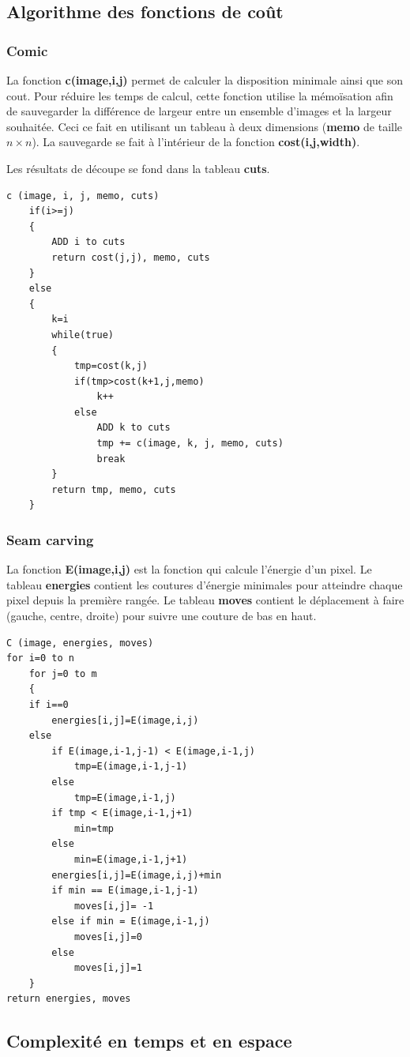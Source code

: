 \documentclass[10pt]{article}
\begin{document}
\subsection{Algorithme des fonctions de coût}
\subsubsection{Comic}La fonction \textbf{ c(image,i,j)} permet de calculer la disposition minimale ainsi que son cout. Pour réduire les temps de calcul, cette fonction utilise la mémoïsation afin de sauvegarder la différence de largeur entre un ensemble d'images et la largeur souhaitée. Ceci ce fait en utilisant un tableau à deux dimensions (\textbf{memo} de taille $n \times n$). La sauvegarde se fait à l'intérieur de la fonction \textbf{cost(i,j,width)}.

Les résultats de découpe se fond dans la tableau \textbf{cuts}.
\begin{lstlisting}[frame=single]
c (image, i, j, memo, cuts)
	if(i>=j)
	{
		ADD i to cuts
		return cost(j,j), memo, cuts 
	}
	else
	{
		k=i
		while(true)
		{
			tmp=cost(k,j)
			if(tmp>cost(k+1,j,memo)
				k++
			else
				ADD k to cuts
				tmp += c(image, k, j, memo, cuts)
				break
		}
		return tmp, memo, cuts
	}
\end{lstlisting}
\subsubsection{Seam carving}
La fonction\textbf{ E(image,i,j)} est la fonction qui calcule l'énergie d'un pixel. Le tableau \textbf{energies} contient les coutures d'énergie minimales pour atteindre chaque pixel depuis la première rangée. Le tableau \textbf{moves} contient le déplacement à faire (gauche, centre, droite) pour suivre une couture de bas en haut. 
\begin{lstlisting}[frame=single]
C (image, energies, moves)
for i=0 to n
	for j=0 to m
	{
	if i==0
		energies[i,j]=E(image,i,j)
	else
		if E(image,i-1,j-1) < E(image,i-1,j)
			tmp=E(image,i-1,j-1)
		else
			tmp=E(image,i-1,j)
		if tmp < E(image,i-1,j+1)
			min=tmp
		else
			min=E(image,i-1,j+1)
		energies[i,j]=E(image,i,j)+min
		if min == E(image,i-1,j-1)			
			moves[i,j]= -1
		else if min = E(image,i-1,j)
			moves[i,j]=0
		else
			moves[i,j]=1
	}
return energies, moves
\end{lstlisting}

\subsection{Complexité en temps et en espace}
\end{document}
